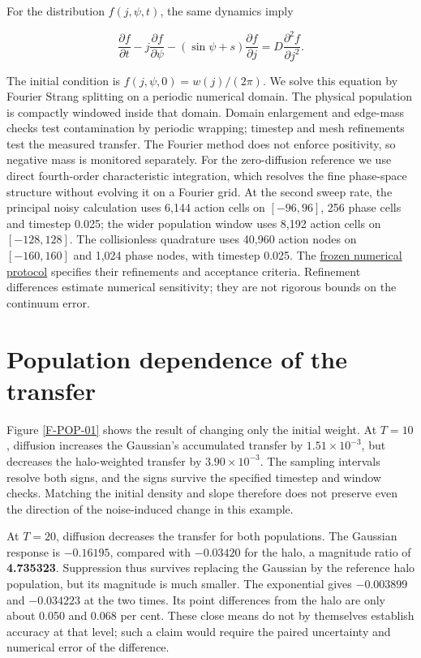 \documentclass[fleqn,usenatbib]{mnras}
\begin{document}
For the distribution \(f(j,\psi,t)\), the same dynamics imply

\begin{equation}\label{EQ-FP-01}
\frac{\partial f}{\partial t}
-j\frac{\partial f}{\partial\psi}
-(\sin\psi+s)\frac{\partial f}{\partial j}
=D\frac{\partial^2 f}{\partial j^2}.
\end{equation}

The initial condition is \(f(j,\psi,0)=w(j)/(2\pi)\). We solve this equation by Fourier Strang splitting on a periodic numerical domain. The physical population is compactly windowed inside that domain. Domain enlargement and edge-mass checks test contamination by periodic wrapping; timestep and mesh refinements test the measured transfer. The Fourier method does not enforce positivity, so negative mass is monitored separately. For the zero-diffusion reference we use direct fourth-order characteristic integration, which resolves the fine phase-space structure without evolving it on a Fourier grid. At the second sweep rate, the principal noisy calculation uses 6,144 action cells on \([-96,96]\), 256 phase cells and timestep 0.025; the wider population window uses 8,192 action cells on \([-128,128]\). The collisionless quadrature uses 40,960 action nodes on \([-160,160]\) and 1,024 phase nodes, with timestep 0.025. The \href{https://djova.ca/galaxy-bar/protocols/ACCURACY_PLAN.md}{frozen numerical protocol} specifies their refinements and acceptance criteria. Refinement differences estimate numerical sensitivity; they are not rigorous bounds on the continuum error.

\section{Population dependence of the transfer}\label{population-result}

Figure \ref{F-POP-01} shows the result of changing only the initial weight. At \(T=10\), diffusion increases the Gaussian's accumulated transfer by \(1.51\times10^{-3}\), but decreases the halo-weighted transfer by \(3.90\times10^{-3}\). The sampling intervals resolve both signs, and the signs survive the specified timestep and window checks. Matching the initial density and slope therefore does not preserve even the direction of the noise-induced change in this example.

At \(T=20\), diffusion decreases the transfer for both populations. The Gaussian response is \(-0.16195\), compared with \(-0.03420\) for the halo, a magnitude ratio of \textbf{4.735323}. Suppression thus survives replacing the Gaussian by the reference halo population, but its magnitude is much smaller. The exponential gives \(-0.003899\) and \(-0.034223\) at the two times. Its point differences from the halo are only about 0.050 and 0.068 per cent. These close means do not by themselves establish accuracy at that level; such a claim would require the paired uncertainty and numerical error of the difference.
\end{document}

